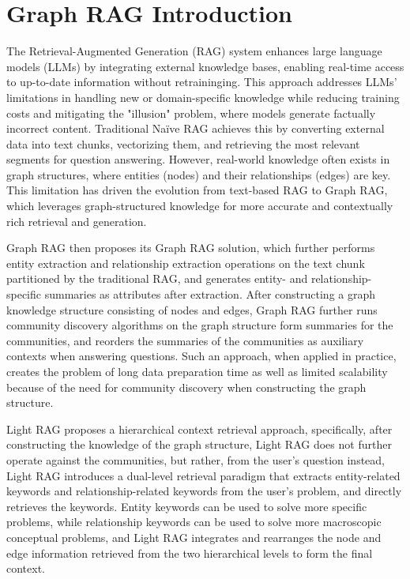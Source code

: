 \appendix
\section{Graph RAG Introduction}
\label{app:graph rags}
The Retrieval-Augmented Generation (RAG) system enhances large
language models (LLMs) by integrating external knowledge bases,
enabling real-time access to up-to-date information without retraininging. This approach addresses LLMs’ limitations in handling new
or domain-specific knowledge while reducing training costs and
mitigating the "illusion" problem, where models generate factually incorrect content. Traditional Naïve RAG achieves this by
converting external data into text chunks, vectorizing them, and
retrieving the most relevant segments for question answering. However, real-world knowledge often exists in graph structures, where
entities (nodes) and their relationships (edges) are key. This limitation has driven the evolution from text-based RAG to Graph RAG,
which leverages graph-structured knowledge for more accurate
and contextually rich retrieval and generation.

Graph RAG then proposes its Graph RAG solution, which
further performs entity extraction and relationship extraction operations on the text chunk partitioned by the traditional RAG, and
generates entity- and relationship-specific summaries as attributes
after extraction. After constructing a graph knowledge structure
consisting of nodes and edges, Graph RAG further runs community
discovery algorithms on the graph structure form summaries for
the communities, and reorders the summaries of the communities
as auxiliary contexts when answering questions. Such an approach,
when applied in practice, creates the problem of long data preparation time as well as limited scalability because of the need for
community discovery when constructing the graph structure.

Light RAG proposes a hierarchical context retrieval approach,
specifically, after constructing the knowledge of the graph structure, Light RAG does not further operate against the communities,
but rather, from the user’s question instead, Light RAG introduces
a dual-level retrieval paradigm that extracts entity-related keywords and relationship-related keywords from the user’s problem,
and directly retrieves the keywords. Entity keywords can be used
to solve more specific problems, while relationship keywords can
be used to solve more macroscopic conceptual problems, and Light
RAG integrates and rearranges the node and edge information
retrieved from the two hierarchical levels to form the final context.

